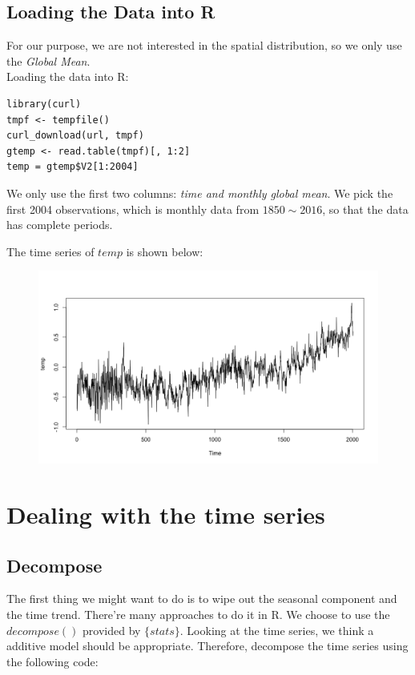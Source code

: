 \documentclass[a4paper, 11pt]{article}
\begin{document}
\subsection{Loading the Data into R}
For our purpose, we are not interested in the spatial distribution, so we only use the \textit{Global Mean}.\\
Loading the data into R:
\begin{verbatim}
library(curl)
tmpf <- tempfile()
curl_download(url, tmpf)
gtemp <- read.table(tmpf)[, 1:2]
temp = gtemp$V2[1:2004]
\end{verbatim}
\indent We only use the first two columns: \textit{time and monthly global mean}. We pick the first 2004 observations, which is monthly data from $1850 \sim 2016$, so that the data has complete periods.\par
The time series of $temp$ is shown below:
\begin{figure}[H]
\centering
\includegraphics[scale=.45]{temp.png}
\end{figure}

\section{Dealing with the time series}

\subsection{Decompose}
The first thing we might want to do is to wipe out the seasonal component and the time trend. There're many approaches to do it in R. We choose to use the $decompose()$ provided by $\{stats\}$. Looking at the time series, we think a additive model should be appropriate. Therefore, decompose the time series using the following code:
\end{document}
